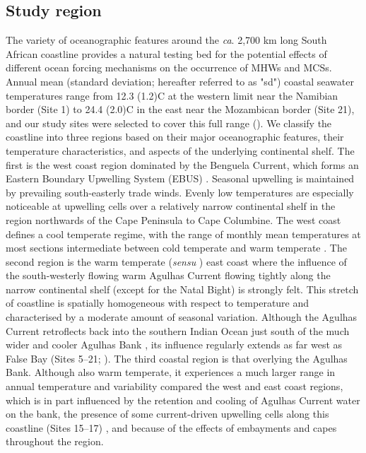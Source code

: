 \documentclass[a4paper,10pt,review]{elsarticle}
\begin{document}
\subsection{Study region}
The variety of oceanographic features around the \emph{ca}. 2,700 km long South African coastline provides a natural testing bed for the potential effects of different ocean forcing mechanisms on the occurrence of MHWs and MCSs. Annual mean (standard deviation; hereafter referred to as "sd") coastal seawater temperatures range from 12.3 (1.2)\degree C at the western limit near the Namibian border (Site 1) to 24.4 (2.0)\degree C in the east near the Mozambican border (Site 21), and our study sites were selected to cover this full range (). We classify the coastline into three regions based on their major oceanographic features, their temperature characteristics, and aspects of the underlying continental shelf. The first is the west coast region dominated by the Benguela Current, which forms an Eastern Boundary Upwelling System (EBUS) \citep{Hutchings2009}. Seasonal upwelling is maintained by prevailing south-easterly trade winds. Evenly low temperatures are especially noticeable at upwelling cells over a relatively narrow continental shelf in the region northwards of the Cape Peninsula to Cape Columbine. The west coast defines a cool temperate regime, with the range of monthly mean temperatures at most sections intermediate between cold temperate and warm temperate \citep{Luning1990}. The second region is the warm temperate (\emph{sensu}  \cite{Luning1990}) east coast where the influence of the south-westerly flowing warm Agulhas Current flowing tightly along the narrow continental shelf (except for the Natal Bight) is strongly felt. This stretch of coastline is spatially homogeneous with respect to temperature and characterised by a moderate amount of seasonal variation. Although the Agulhas Current retroflects back into the southern Indian Ocean \citep{Hutchings2009} just south of the much wider and cooler Agulhas Bank \citep{Roberts2005}, its influence regularly extends as far west as False Bay (Sites 5--21; ). The third coastal region is that overlying the Agulhas Bank. Although also warm temperate, it experiences a much larger range in annual temperature and variability compared the west and east coast regions, which is in part influenced by the retention and cooling of Agulhas Current water on the bank, the presence of some current-driven upwelling cells along this coastline (Sites 15--17) \citep{Roberts2005}, and because of the effects of embayments and capes throughout the region.
\end{document}
